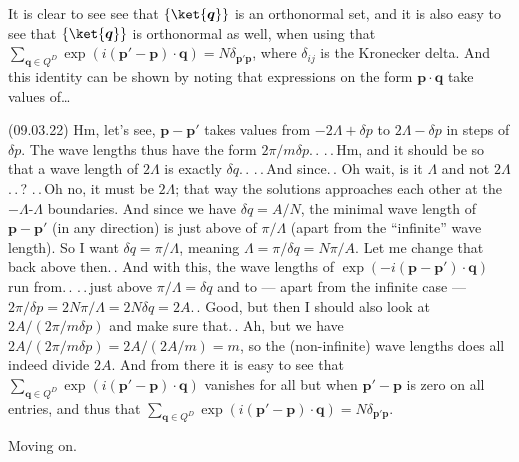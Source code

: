 \documentclass{report}
\begin{document}
It is clear to see see that $\{\ket{\boldsymbol{q}}\}$ is an orthonormal set, and it is also easy to see that $\{\ket{\boldsymbol{q}}\}$ is orthonormal as well, when using that 
%	
$\sum_{\boldsymbol{q}\in Q^D} 
\exp(i (\boldsymbol{p}' - \boldsymbol{p}) \cdot \boldsymbol{q}) 
= N\delta_{\boldsymbol{p}' \boldsymbol{p}}$, 
where $\delta_{ij}$ is the Kronecker delta. And this identity can be shown by noting that expressions on the form $\boldsymbol{p} \cdot \boldsymbol{q}$ take values of\ldots %

(09.03.22) Hm, let's see, $\boldsymbol{p} - \boldsymbol{p}'$ takes values from %
$-2\Lambda + \delta p$ to $2\Lambda - \delta p$ 
in steps of $\delta p$. The wave lengths thus have the form $2\pi / m\delta p$.\,. .\,.\,Hm, and it should be so that a wave length of $2\Lambda$ is exactly $\delta q$.\,. .\,.\,And since.\,. Oh wait, is it $\Lambda$ and not $2\Lambda$.\,.\,? .\,.\,Oh no, it must be $2\Lambda$; that way the solutions approaches each other at the $-\Lambda$-$\Lambda$ boundaries. And since we have $\delta q = A / N$, the minimal wave length of $\boldsymbol{p} - \boldsymbol{p}'$ (in any direction) is just above of $\pi/\Lambda$ (apart from the ``infinite'' wave length). So I want $\delta q = \pi/\Lambda$, meaning $\Lambda = \pi/\delta q = N\pi / A$. Let me change that back above then.\,.  And with this, the wave lengths of $\exp(-i(\boldsymbol{p} - \boldsymbol{p}') \cdot \boldsymbol{q})$ run from.\,. .\,.\,just above $\pi/\Lambda=\delta q$ and to --- apart from the infinite case --- $2\pi / \delta p = 2N\pi/\Lambda = 2N \delta q = 2A$.\,. Good, but then I should also look at $2A / (2\pi/m\delta p)$ and make sure that.\,. Ah, but we have $2A / (2\pi/m\delta p) = 2A / (2A / m) = m$, so the (non-infinite) wave lengths does all indeed divide $2A$. And from there it is easy to see that
$\sum_{\boldsymbol{q}\in Q^D} 
\exp(i (\boldsymbol{p}' - \boldsymbol{p}) \cdot \boldsymbol{q})$ 
vanishes for all but when $\boldsymbol{p}' - \boldsymbol{p}$ is zero on all entries, and thus that  
$\sum_{\boldsymbol{q}\in Q^D} 
\exp(i (\boldsymbol{p}' - \boldsymbol{p}) \cdot \boldsymbol{q}) 
= N\delta_{\boldsymbol{p}' \boldsymbol{p}}$.


Moving on.
\end{document}
